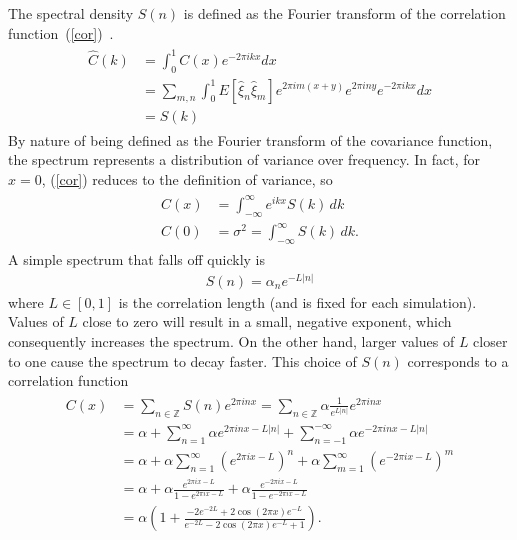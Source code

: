 The spectral density $S(n)$ is defined as the Fourier transform of the
correlation function~(\ref{cor})~\cite{gelhar}. 
\begin{align*}
\begin{split}
\hat{C}(k) &= \int_{0}^{1}C(x)e^{-2\pi ikx}dx\\
&= \sum_{m,n} \int_{0}^{1} E[\hat{\xi}_n\hat{\xi}_m] e^{2\pi
  im(x+y)}e^{2\pi iny}e^{-2\pi ikx}dx\\
&=S(k)
\end{split}
\end{align*}
By nature of being defined as the Fourier transform of the covariance
function, the spectrum represents a distribution of variance over
frequency. In fact, for $x=0$, (\ref{cor}) reduces to the definition
of variance, so 
\begin{align*}
\begin{split}
C(x) &= \int_{-\infty}^{\infty}e^{ikx}S(k)\,dk\\
C(0) &= \sigma^2 = \int_{-\infty}^{\infty}S(k)\, dk.
\end{split}
\end{align*}
A simple spectrum that falls off quickly is
\begin{align}\label{spec}
S(n)=\alpha_n e^{-L|n|}
\end{align}
where $L \in [0,1]$ is the correlation length (and is fixed
for each simulation). Values of $L$ close to zero will result in a
small, negative exponent, which consequently increases the
spectrum. On the other hand, larger values of $L$ closer to one cause
the spectrum to decay faster. This choice of $S(n)$ corresponds to a correlation function
\begin{align}
\begin{split}
C(x) &= \sum_{n\in \mathbb{Z}}S(n)e^{2\pi inx}=\sum_{n\in \mathbb{Z}}\alpha \frac{1}{e^{L|n|}}e^{2\pi inx}\\
&= \alpha + \sum_{n=1}^{\infty}\alpha e^{2\pi
  inx-L|n|}+\sum_{n=-1}^{-\infty}\alpha e^{-2\pi inx-L|n|}\\
&= \alpha+\alpha \sum_{n=1}^{\infty}(e^{2\pi ix-L})^n+\alpha \sum_{m=1}^{\infty}(e^{-2\pi ix-L})^m\\
&=\alpha + \alpha \frac{e^{2\pi ix-L}}{1-e^{2\pi ix-L}} +\alpha
\frac{e^{-2\pi ix-L}}{1-e^{-2\pi ix-L}}\\
&=\alpha \left(1+ \frac{-2e^{-2L}+2\cos(2\pi x)e^{-L}}{e^{-2L}-2\cos(2\pi x)e^{-L}+1} \right).\\
\end{split}
\end{align}
